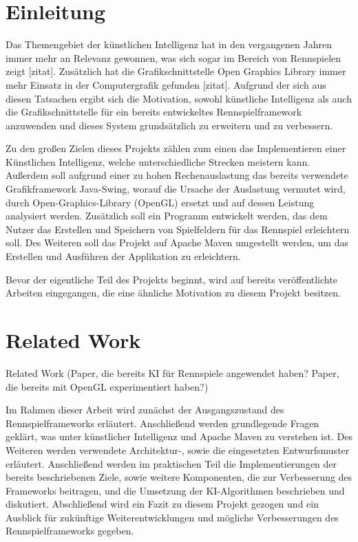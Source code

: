 \section{Einleitung}
Das Themengebiet der künstlichen Intelligenz hat in den vergangenen Jahren immer mehr an Relevanz gewonnen, was sich sogar im Bereich von Rennspielen zeigt [zitat]. Zusätzlich hat die Grafikschnittstelle Open Graphics Library immer mehr Einsatz in der Computergrafik gefunden [zitat]. Aufgrund der sich aus diesen Tatsachen ergibt sich die Motivation, sowohl künstliche Intelligenz als auch die Grafikschnittstelle für ein bereits entwickeltes Rennspielframework anzuwenden und dieses System grundsätzlich zu erweitern und zu verbessern.

Zu den großen Zielen dieses Projekts zählen zum einen das Implementieren einer Künstlichen Intelligenz, welche unterschiedliche Strecken meistern kann. Außerdem soll aufgrund einer zu hohen Rechenauslastung  das bereits verwendete Grafikframework Java-Swing, worauf die Ursache der Auslastung vermutet wird, durch Open-Graphics-Library (OpenGL) ersetzt und auf dessen Leistung analysiert werden. Zusätzlich soll ein Programm entwickelt werden, das dem Nutzer das Erstellen und Speichern von Spielfeldern für das Rennspiel erleichtern soll. Des Weiteren soll das Projekt auf Apache Maven umgestellt werden, um das Erstellen und Ausführen der Applikation zu erleichtern.

Bevor der eigentliche Teil des Projekts beginnt, wird auf bereits veröffentlichte Arbeiten eingegangen, die eine ähnliche Motivation zu diesem Projekt besitzen.

\section{Related Work}
Related Work (Paper, die bereits KI für Rennspiele angewendet haben? Paper, die bereits mit OpenGL experimentiert haben?)

Im Rahmen dieser Arbeit wird zunächst der Ausgangszustand des Rennspielframeworks erläutert. Anschließend werden grundlegende Fragen geklärt, was unter künstlicher Intelligenz und Apache Maven zu verstehen ist. Des Weiteren werden verwendete Architektur-, sowie die eingesetzten Entwurfsmuster erläutert. Anschließend werden im praktischen Teil die Implementierungen der bereits beschriebenen Ziele, sowie weitere Komponenten, die zur Verbesserung des Frameworks beitragen, und die Umsetzung der KI-Algorithmen beschrieben und diskutiert. Abschließend wird ein Fazit zu diesem Projekt gezogen und ein Ausblick für zukünftige Weiterentwicklungen und mögliche Verbesserungen des Rennspielframeworks gegeben.